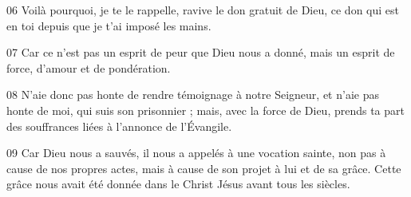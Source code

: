 
06 Voilà pourquoi, je te le rappelle, ravive le don gratuit de Dieu, ce don qui est en toi depuis que je t’ai imposé les mains.

07 Car ce n’est pas un esprit de peur que Dieu nous a donné, mais un esprit de force, d’amour et de pondération.

08 N’aie donc pas honte de rendre témoignage à notre Seigneur, et n’aie pas honte de moi, qui suis son prisonnier ; mais, avec la force de Dieu, prends ta part des souffrances liées à l’annonce de l’Évangile.

09 Car Dieu nous a sauvés, il nous a appelés à une vocation sainte, non pas à cause de nos propres actes, mais à cause de son projet à lui et de sa grâce. Cette grâce nous avait été donnée dans le Christ Jésus avant tous les siècles.